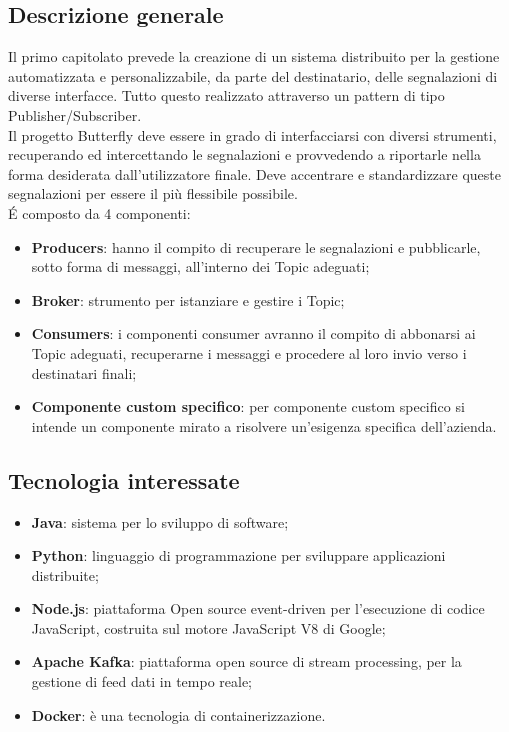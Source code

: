 \documentclass[11pt,a4paper]{article}
\begin{document}
	\subsection{Descrizione generale}
	Il primo capitolato prevede la creazione di un sistema distribuito per la gestione automatizzata e personalizzabile, da parte del destinatario, delle segnalazioni di diverse interfacce. Tutto questo realizzato attraverso un pattern di tipo Publisher/Subscriber. \\
	Il progetto Butterfly deve essere in grado di interfacciarsi con diversi strumenti, recuperando ed intercettando le segnalazioni e provvedendo a riportarle nella forma desiderata dall'utilizzatore finale. Deve accentrare e standardizzare queste segnalazioni per essere il più flessibile possibile.\\
	\'E composto da 4 componenti:
	\begin{itemize}
		\item \textbf{Producers}: hanno il compito di recuperare le segnalazioni e pubblicarle, sotto forma di messaggi, all'interno dei Topic adeguati;
		\item \textbf{Broker}: strumento per istanziare e gestire i Topic;
		\item \textbf{Consumers}: i componenti consumer avranno il compito di abbonarsi ai Topic adeguati, recuperarne i	messaggi e procedere al loro invio verso i destinatari finali;
		\item \textbf{Componente custom specifico}: per componente custom specifico si intende un componente mirato a risolvere un'esigenza specifica dell'azienda. 
	\end{itemize}
	\subsection{Tecnologia interessate}
	\begin{itemize}
		\item \textbf{Java}: sistema per lo sviluppo di software;
		\item \textbf{Python}: linguaggio di programmazione per sviluppare applicazioni distribuite;
		\item \textbf{Node.js}: piattaforma Open source event-driven per l'esecuzione di codice JavaScript, costruita sul motore JavaScript V8 di Google;
		\item \textbf{Apache Kafka}: piattaforma open source di stream processing, per la gestione di feed dati in tempo reale;		
		\item \textbf{Docker}: è una tecnologia di containerizzazione.
	\end{itemize}
\end{document}
